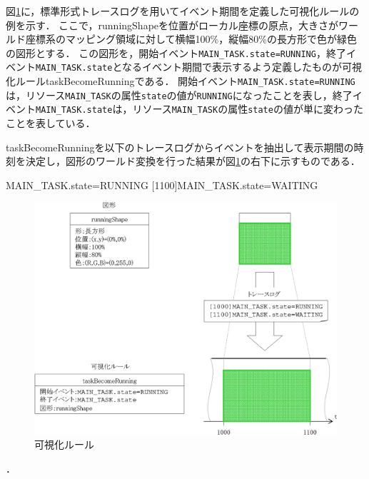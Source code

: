 図\ref{fig:timeShape}に，標準形式トレースログを用いてイベント期間を定義した可視化ルールの例を示す．
ここで，runningShapeを位置がローカル座標の原点，大きさがワールド座標系のマッピング領域に対して横幅100\%，縦幅80\%の長方形で色が緑色の図形とする．
この図形を，開始イベント\verb|MAIN_TASK.state=RUNNING|，終了イベント\verb|MAIN_TASK.state|となるイベント期間で表示するよう定義したものが可視化ルールtaskBecomeRunningである．
開始イベント\verb|MAIN_TASK.state=RUNNING|は，リソース\verb|MAIN_TASK|の属性\verb|state|の値が\verb|RUNNING|になったことを表し，終了イベント\verb|MAIN_TASK.state|は，リソース\verb|MAIN_TASK|の属性\verb|state|の値が単に変わったことを表している．

taskBecomeRunningを以下のトレースログからイベントを抽出して表示期間の時刻を決定し，図形のワールド変換を行った結果が図\ref{fig:timeShape}の右下に示すものである．

\begin{File}
[1000]MAIN_TASK.state=RUNNING
[1100]MAIN_TASK.state=WAITING
\end{File}
\vfill
\begin{figure}[h]
\begin{center}
\includegraphics[scale=0.9]{img/timeShape.eps}
\caption{可視化ルール}
\label{fig:timeShape}
\end{center}
\end{figure}
．
